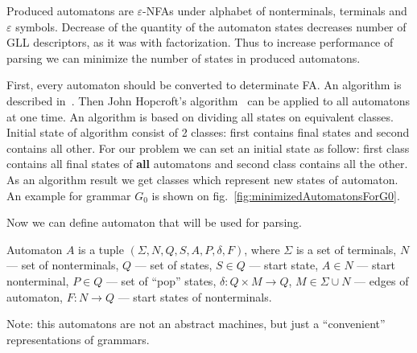 \documentclass[runningheads,a4paper]{llncs}
\begin{document}
Produced automatons are $\varepsilon$-NFAs under alphabet of nonterminals, terminals and $\varepsilon$ symbols.
Decrease of the quantity of the automaton states decreases number of GLL descriptors, as it was with factorization.
Thus to increase performance of parsing we can minimize the number of states in produced automatons.

First, every automaton should be converted to determinate FA. An algorithm is described in~\cite{aho1974design}.
Then John Hopcroft's algorithm~\cite{hopcroft1971n} can be applied to all automatons at one time. 
An algorithm is based on dividing all states on equivalent classes. Initial state of algorithm consist 
of 2 classes: first contains final states and second contains all other. For our problem we can set an 
initial state as follow: first class contains all final states of \textbf{all} automatons and second class 
contains all the other. As an algorithm result we get classes which represent new states of automaton. 
An example for grammar $G_0$ is shown on fig.~\ref{fig:minimizedAutomatonsForG0}.

Now we can define automaton that will be used for parsing.

\begin{mydef}
Automaton $A$ is a tuple $(\Sigma, N, Q, S, A, P, \delta, F)$, where
$\Sigma$ is a set of terminals,
$N$ --- set of nonterminals,
$Q$ --- set of states,
$S \in Q$ --- start state,
$A \in N$ --- start nonterminal,
$P \in Q$ --- set of ``pop'' states,
$\delta : Q \times M \to Q$, 
$M \in \Sigma \cup N$ --- edges of automaton,
$F : N \to Q$ --- start states of nonterminals.
\end{mydef}

Note: this automatons are not an abstract machines, but just a ``convenient'' representations of grammars.
\end{document}
